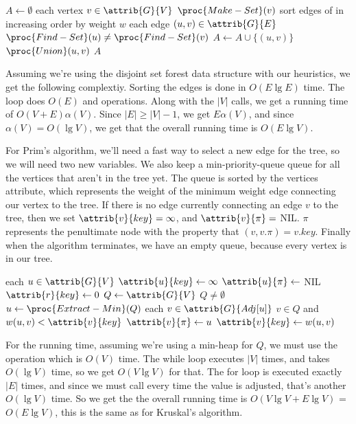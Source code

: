 \documentclass[11pt]{article}
\theoremstyle{definition}
\begin{document}
\begin{codebox}
  \li \(A \gets \emptyset\)
  \li \For each vertex \(v \in \attrib{G}{V}\) \Do
    \li \(\proc{Make-Set}(v)\) \End
  \li sort edges of  in increasing order by weight \(w\)
  \li \For each edge \((u,v)\in \attrib{G}{E}\) \Do
    \li \If \(\proc{Find-Set}(u) \neq \proc{Find-Set}(v)\) \Then
      \li \(A \gets A \cup \{(u,v)\}\)
      \li \(\proc{Union}(u,v)\) \End \End 
  \li \Return \(A\)
\end{codebox}

Assuming we're using the disjoint set forest data structure with our heuristics, we get the following 
complextiy.  Sorting the edges is done in \(O(E \lg E)\) time. The loop does \(O(E)\) 
 and  operations. Along with the \(|V|\)  calls, we get 
a running time of \(O(V+E)\alpha(V)\). Since \(|E| \geq |V|-1\), we get \(E\alpha(V)\), and since 
\(\alpha(V) = O(\lg V)\), we get that the overall running time is \(O(E \lg V)\).
\newpage 

For Prim's algorithm, we'll need a fast way to select a new edge for the tree, so we will need two 
new variables. We also keep a min-priority-queue queue for all the vertices that aren't in the tree 
yet. The queue is sorted by the vertices  attribute, which represents the weight of the 
minimum weight edge connecting our vertex to the tree. If there is no edge currently connecting an 
edge \(v\) to the tree, then we set \(\attrib{v}{key} = \infty\), and \(\attrib{v}{\pi} = \) NIL.
\(\pi\) represents the penultimate node with the property that \((v,v.\pi) = v.key\).  Finally 
when the algorithm terminates, we have an empty queue, because every vertex is in our tree.
\begin{codebox}
  \li \For each \(u \in \attrib{G}{V}\) \Do 
    \li \(\attrib{u}{key} \gets \infty\)
    \li \(\attrib{u}{\pi} \gets \) NIL \End 
  \li \(\attrib{r}{key} \gets 0\)
  \li \(Q \gets \attrib{G}{V}\)
  \li \While \(Q \neq \emptyset\) \Do 
    \li \(u \gets \proc{Extract-Min}(Q)\)
    \li \For each \(v \in \attrib{G}{Adj[u]}\) \Do 
      \li \If \(v \in Q\) and \(w(u,v) < \attrib{v}{key}\) \Then 
        \li \(\attrib{v}{\pi} \gets u\)
        \li \(\attrib{v}{key} \gets w(u,v)\) \End \End \End
\end{codebox}

For the running time, assuming we're using a min-heap for \(Q\), we must use the 
 operation which is \(O(V)\) time.  The while loop executes \(|V|\) times, 
and  takes \(O(\lg V)\) time, so we get \(O(V \lg V)\) for that. The for loop 
is executed exactly \(|E|\) times, and since we must call  every time the 
 value is adjusted, that's another \(O(\lg V)\) time.  So we get the the overall running 
time is \(O(V \lg V + E \lg V)\) = \(O(E \lg V)\), this is the same as for Kruskal's algorithm.
\end{document}

